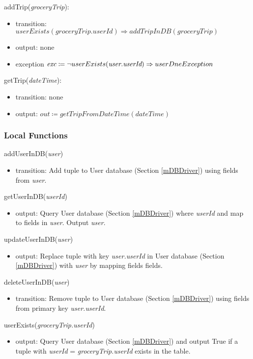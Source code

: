 \documentclass[12pt, titlepage]{article}
\begin{document}
\noindent addTrip(\textit{groceryTrip}):
\begin{itemize}
\item transition: \( userExists(\textit{groceryTrip.userId}) \Rightarrow addTripInDB(\textit{groceryTrip})\) 
\item output: none
\item exception \( \textit{exc} \coloneqq \neg userExists(\textit{user.userId}) \Rightarrow \\ userDneException\)
\end{itemize}

\noindent getTrip(\textit{dateTime}):
\begin{itemize}
\item transition: none
\item output: \( \textit{out} \coloneqq getTripFromDateTime(\textit{dateTime}) \)
\end{itemize}

\subsubsection{Local Functions}
addUserInDB(\textit{user})
\begin{itemize}
\item transition: Add tuple to User database (Section \ref{mDBDriver}) using fields from \textit{user}.
\end{itemize}

\noindent getUserInDB(\textit{userId})
\begin{itemize}
\item output:  Query User database (Section \ref{mDBDriver}) where \textit{userId} and map to fields in \textit{user}. Output \textit{user}.
\end{itemize}

\noindent updateUserInDB(\textit{user})
\begin{itemize}
\item output:  Replace tuple with key \textit{user.userId} in User database (Section \ref{mDBDriver}) with \textit{user} by mapping fields fields.
\end{itemize}

\noindent deleteUserInDB(\textit{user})
\begin{itemize}
\item transition: Remove tuple to User database (Section \ref{mDBDriver}) using fields from primary key \textit{user.userId}.
\end{itemize}

\noindent userExists(\textit{groceryTrip.userId})
\begin{itemize}
\item output: Query User database (Section \ref{mDBDriver}) and output True if a tuple with \textit{userId} = \textit{groceryTrip.userId} exists in the table.
\end{itemize}
\end{document}
